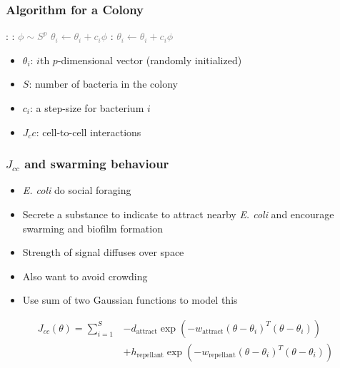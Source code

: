 \documentclass{beamer}
\begin{document}
\begin{frame}
\frametitle{Algorithm for a Colony}
\begin{algorithmic}[1]
\For {\textcolor{gray}{$j \gets 1 \dots N_c $}}:
  :
    \State \textcolor{gray}{$\phi \sim S^p$}
    \State \textcolor{gray}{$\theta_i \gets \theta_i + c_i \phi$}
    :
      \State \textcolor{gray}{$\theta_i \gets \theta_i + c_i \phi$}
    \EndWhile
  \EndFor
\EndFor
\end{algorithmic}
\begin{itemize}
  \item $\theta_i$: $i$th $p$-dimensional vector (randomly initialized)
  \item $S$: number of bacteria in the colony
  \item $c_i$: a step-size for bacterium $i$
  \item $J_cc$: cell-to-cell interactions
\end{itemize}
\end{frame}

\begin{frame}
\frametitle{$J_{cc}$ and swarming behaviour}
\begin{itemize}
  \item \textit{\textit{E. coli}} do social foraging
  \item Secrete a substance to indicate to attract nearby \textit{\textit{E. coli}} and encourage swarming and biofilm formation
  \item Strength of signal diffuses over space
  \item Also want to avoid crowding
  \item Use sum of two Gaussian functions to model this
\end{itemize}
\begin{align*}
J_{cc}(\theta) = \sum_{i=1}^S &-d_\text{attract} \exp \left( -w_\text{attract} (\theta - \theta_i)^T (\theta - \theta_i) \right) \\ &+ h_\text{repellant} \exp \left( -w_\text{repellant} (\theta - \theta_i)^T (\theta - \theta_i) \right)
\end{align*}
\end{frame}
\end{document}
